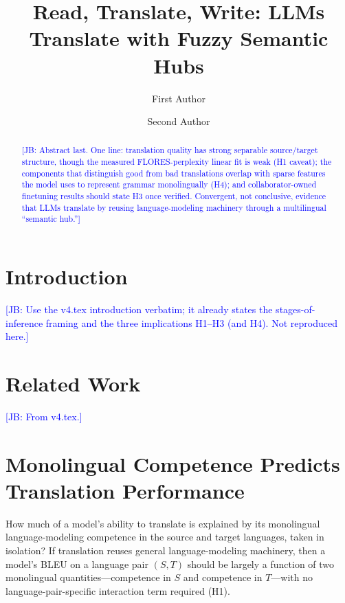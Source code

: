 \documentclass[11pt]{article}
\title{Read, Translate, Write: LLMs Translate with Fuzzy Semantic Hubs}
\author{First Author \and Second Author}
\newcommand{\jb}[1]{\textcolor{blue}{[JB: #1]}} %
\begin{document}
\maketitle
\begin{abstract}
\jb{Abstract last. One line: translation quality has strong separable
source/target structure, though the measured FLORES-perplexity linear fit is
weak (H1 caveat); the components that distinguish good from bad translations
overlap with sparse features the model uses to represent grammar monolingually
(H4); and collaborator-owned finetuning results should state H3 once verified.
Convergent, not conclusive, evidence that LLMs translate by reusing
language-modeling machinery through a multilingual ``semantic hub.''}
\end{abstract}

\section{Introduction}
\jb{Use the v4.tex introduction verbatim; it already states the stages-of-inference
framing and the three implications H1--H3 (and H4). Not reproduced here.}

\section{Related Work}
\jb{From v4.tex.}

\section{Monolingual Competence Predicts Translation Performance}
\label{sec:linear}

How much of a model's ability to translate is explained by its monolingual
language-modeling competence in the source and target languages, taken in
isolation? If translation reuses general language-modeling machinery, then a
model's BLEU on a language pair $(S,T)$ should be largely a function of two
monolingual quantities---competence in $S$ and competence in $T$---with no
language-pair-specific interaction term required (H1).
\end{document}
